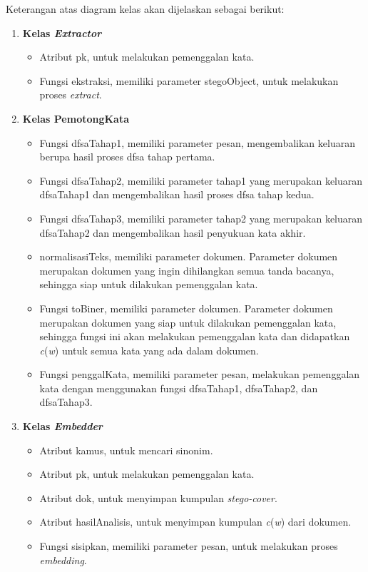 Keterangan atas diagram kelas akan dijelaskan sebagai berikut:

\begin{enumerate}

	\item \textbf{Kelas \textit{Extractor}}
	\begin{itemize}
		\item Atribut pk, untuk melakukan pemenggalan kata.
		\item Fungsi ekstraksi, memiliki parameter stegoObject, untuk melakukan proses \textit{extract}.
	\end{itemize}

	\item \textbf{Kelas PemotongKata}
	\begin{itemize}
		\item Fungsi dfsaTahap1, memiliki parameter pesan, mengembalikan keluaran berupa hasil proses dfsa tahap pertama.
		\item Fungsi dfsaTahap2, memiliki parameter tahap1 yang merupakan keluaran dfsaTahap1 dan mengembalikan hasil proses dfsa tahap kedua.
		\item Fungsi dfsaTahap3, memiliki parameter tahap2 yang merupakan keluaran dfsaTahap2 dan mengembalikan hasil penyukuan kata akhir.
		\item normalisasiTeks, memiliki parameter dokumen. Parameter dokumen merupakan dokumen yang ingin dihilangkan semua tanda bacanya, sehingga siap untuk dilakukan pemenggalan kata.
		\item Fungsi toBiner, memiliki parameter dokumen. Parameter dokumen merupakan dokumen yang siap untuk dilakukan pemenggalan kata, sehingga fungsi ini akan melakukan pemenggalan kata dan didapatkan \textit{c}(\textit{w}) untuk semua kata yang ada dalam dokumen.
		\item Fungsi penggalKata, memiliki parameter pesan, melakukan pemenggalan kata dengan menggunakan fungsi dfsaTahap1, dfsaTahap2, dan dfsaTahap3.
	\end{itemize}

	\item \textbf{Kelas \textit{Embedder}}
	\begin{itemize}
		\item Atribut kamus, untuk mencari sinonim.
		\item Atribut pk, untuk melakukan pemenggalan kata.
		\item Atribut dok, untuk menyimpan kumpulan \textit{stego-cover}.
		\item Atribut hasilAnalisis, untuk menyimpan kumpulan \textit{c}(\textit{w}) dari dokumen.
		\item Fungsi sisipkan, memiliki parameter pesan, untuk melakukan proses \textit{embedding}.
	\end{itemize}


\end{enumerate}
